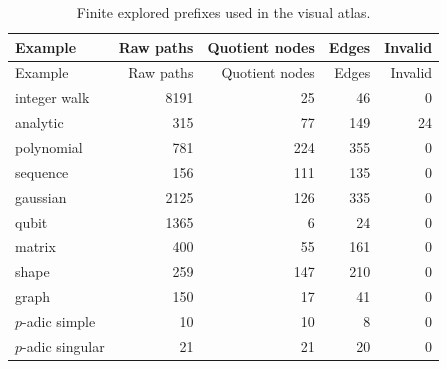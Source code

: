 \begin{longtable}{lrrrr}
\caption{Finite explored prefixes used in the visual atlas.}\label{tab:example-summary}\\
\toprule
Example & Raw paths & Quotient nodes & Edges & Invalid \\
\midrule
\endfirsthead
\toprule
Example & Raw paths & Quotient nodes & Edges & Invalid \\
\midrule
\endhead
integer walk & 8191 & 25 & 46 & 0 \\
analytic & 315 & 77 & 149 & 24 \\
polynomial & 781 & 224 & 355 & 0 \\
sequence & 156 & 111 & 135 & 0 \\
gaussian & 2125 & 126 & 335 & 0 \\
qubit & 1365 & 6 & 24 & 0 \\
matrix & 400 & 55 & 161 & 0 \\
shape & 259 & 147 & 210 & 0 \\
graph & 150 & 17 & 41 & 0 \\
$p$-adic simple & 10 & 10 & 8 & 0 \\
$p$-adic singular & 21 & 21 & 20 & 0 \\
\bottomrule
\end{longtable}
